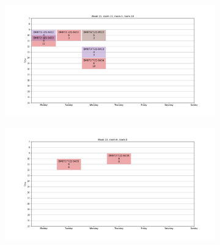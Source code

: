 \documentclass{article}
\begin{document}
\begin{figure}
\begin{subfigure}{.85\textwidth}
        \end{subfigure}
        \hspace*{-5cm}
        \begin{subfigure}{.85\textwidth}
            \centering
            \includegraphics[width=1.1\linewidth]{../images/week-21.png}
        \end{subfigure}%
        \begin{subfigure}{.85\textwidth}
            \centering
            \includegraphics[width=1.1\linewidth]{../images/week-22.png}
        \end{subfigure}
    \end{figure}
\end{document}
